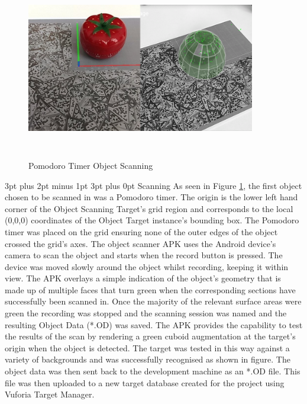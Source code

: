 \documentclass[12pt,a4paper,oneside]{article}
\makeatletter
\renewcommand\paragraph{\@startsection {paragraph}{1}{0mm} %
	                           {3pt plus 2pt minus 1pt} %
	                           {3pt plus 0pt} %
	                           {\normalfont}}
\makeatother
\begin{document}
\begin{figure}[!h]
	\centering
	\includegraphics[width=10cm,height=8cm,keepaspectratio]{images/pomo}
	\caption{Pomodoro Timer Object Scanning}
	\label{fig_pomo}
\end{figure}


\paragraph{Scanning} %
As seen in Figure \ref{fig_pomo}, the first object chosen to be scanned in was a Pomodoro timer. The origin is the lower left hand corner of the Object Scanning Target's grid region and corresponds to the local (0,0,0) coordinates of the Object Target instance's bounding box. The Pomodoro timer was placed on the grid ensuring none of the outer edges of the object crossed the grid's axes. The object scanner APK uses the Android device's camera to scan the object and starts when the record button is pressed. The device was moved slowly around the object whilst recording, keeping it within view. The APK overlays a simple indication of the object's geometry that is made up of multiple faces that turn green when the corresponding sections have successfully been scanned in. Once the majority of the relevant surface areas were green the recording was stopped and the scanning session was named and the resulting Object Data (*.OD) was saved. The APK provides the capability to test the results of the scan by rendering a green cuboid augmentation at the target's origin when the object is detected. The target was tested in this way against a variety of backgrounds and was successfully recognised as shown in figure. 
The object data was then sent back to the development machine as an *.OD file. This file was then uploaded to a new target database created for the project using Vuforia Target Manager.
\end{document}
